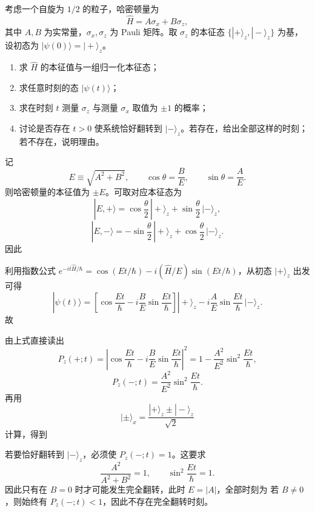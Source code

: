 \begin{question}
考虑一个自旋为 $1/2$ 的粒子，哈密顿量为
\[
\hat H=A\sigma_x+B\sigma_z,
\]
其中 $A,B$ 为实常量，$\sigma_x,\sigma_z$ 为 Pauli 矩阵。取 $\sigma_z$ 的本征态 $\{|+\rangle_z,|-\rangle_z\}$ 为基，设初态为 $|\psi(0)\rangle=|+\rangle_z$。

\begin{enumerate}[label=(\arabic*),leftmargin=2.5em]
  \item 求 $\hat H$ 的本征值与一组归一化本征态；
  \item 求任意时刻的态 $|\psi(t)\rangle$；
  \item 求在时刻 $t$ 测量 $\sigma_z$ 与测量 $\sigma_x$ 取值为 $\pm1$ 的概率；
  \item 讨论是否存在 $t>0$ 使系统恰好翻转到 $|-\rangle_z$。若存在，给出全部这样的时刻；若不存在，说明理由。
\end{enumerate}

\begin{solution}
记
\[
E\equiv \sqrt{A^2+B^2},\qquad \cos\theta=\frac{B}{E},\qquad \sin\theta=\frac{A}{E}.
\]
则哈密顿量的本征值为 $\pm E$。可取对应本征态为
\[
|E,+\rangle=\cos\frac\theta2\,|+\rangle_z+\sin\frac\theta2\,|-\rangle_z,
\]
\[
|E,-\rangle=-\sin\frac\theta2\,|+\rangle_z+\cos\frac\theta2\,|-\rangle_z.
\]
因此

利用指数公式 $e^{-it\hat H/\hbar}=\cos(Et/\hbar)-i(\hat H/E)\sin(Et/\hbar)$，从初态 $|+\rangle_z$ 出发可得
\[
|\psi(t)\rangle=
\left[\cos\frac{Et}{\hbar}-i\frac{B}{E}\sin\frac{Et}{\hbar}\right]|+\rangle_z
-i\frac{A}{E}\sin\frac{Et}{\hbar}\,|-\rangle_z.
\]
故

由上式直接读出
\[
P_z(+;t)=\left|\cos\frac{Et}{\hbar}-i\frac{B}{E}\sin\frac{Et}{\hbar}\right|^2
=1-\frac{A^2}{E^2}\sin^2\frac{Et}{\hbar},
\]
\[
P_z(-;t)=\frac{A^2}{E^2}\sin^2\frac{Et}{\hbar}.
\]
再用
\[
|\pm\rangle_x=\frac{|+\rangle_z\pm |-\rangle_z}{\sqrt2}
\]
计算，得到

若要恰好翻转到 $|-\rangle_z$，必须使 $P_z(-;t)=1$。这要求
\[
\frac{A^2}{A^2+B^2}=1,
\qquad
\sin^2\frac{Et}{\hbar}=1.
\]
因此只有在 $B=0$ 时才可能发生完全翻转，此时 $E=|A|$，全部时刻为
若 $B\neq 0$，则始终有 $P_z(-;t)<1$，因此不存在完全翻转时刻。
\end{solution}
\end{question}

